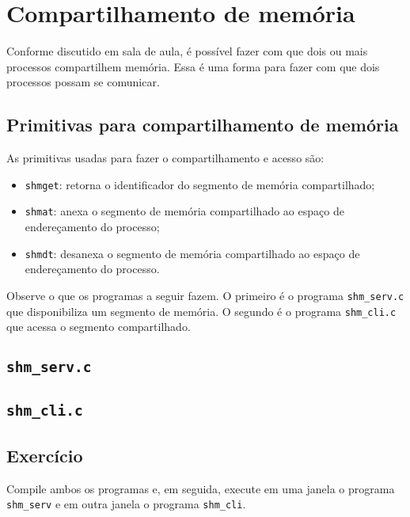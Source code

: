 \chapter{Compartilhamento de memória}

Conforme discutido em sala de aula, é possível fazer com que dois ou mais processos compartilhem memória. Essa é uma forma para fazer com que dois processos possam se comunicar.

\section{Primitivas para compartilhamento de memória}
As primitivas usadas para fazer o compartilhamento e acesso são:
\begin{itemize}
\setlength{\itemsep}{1pt}\setlength{\parskip}{0pt}  \setlength{\parsep}{0pt}
\item \texttt{shmget}: retorna o identificador do segmento de memória compartilhado;
\item \texttt{shmat}: anexa o segmento de memória compartilhado ao espaço de endereçamento do processo;
\item \texttt{shmdt}: desanexa o segmento de memória compartilhado ao espaço de endereçamento do processo.
\end{itemize}

Observe o que os programas a seguir fazem. O primeiro é o programa \texttt{shm\_serv.c} que disponibiliza um segmento de memória. O segundo é o programa \texttt{shm\_cli.c} que acessa o segmento compartilhado.

\section*{\texttt{shm\_serv.c}}


\newpage
\section*{\texttt{shm\_cli.c}}


\section{Exercício}

Compile ambos os programas e, em seguida, execute em uma janela o programa  \texttt{shm\_serv} e em outra janela o programa \texttt{shm\_cli}.

